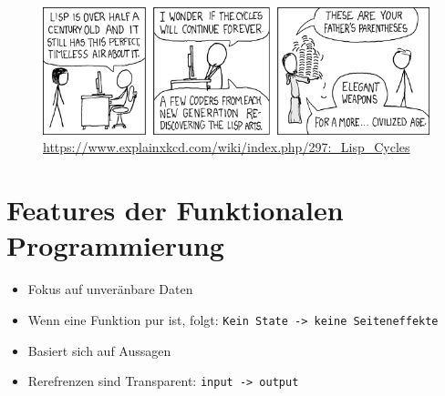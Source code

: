 \documentclass{beamer}
\def\code#1{\texttt{#1}}
\begin{document}
\begin{frame}
	\begin{figure}
	    \centering
	    \includegraphics[width=1\linewidth]{bilder/lisp_cycles.png}
        \textmd{ \tiny \url{https://www.explainxkcd.com/wiki/index.php/297:_Lisp_Cycles}}
	\end{figure}
\end{frame}

\section{Features der Funktionalen Programmierung}
\begin{frame}
	\begin{itemize}
		\item Fokus auf unveränbare Daten
            \item Wenn eine Funktion pur ist, folgt: \code{Kein State -> keine Seiteneffekte}
            \item Basiert sich auf Aussagen
            \item Rerefrenzen sind Transparent:   \code{input -> output}
	\end{itemize}
\end{frame}
\end{document}
